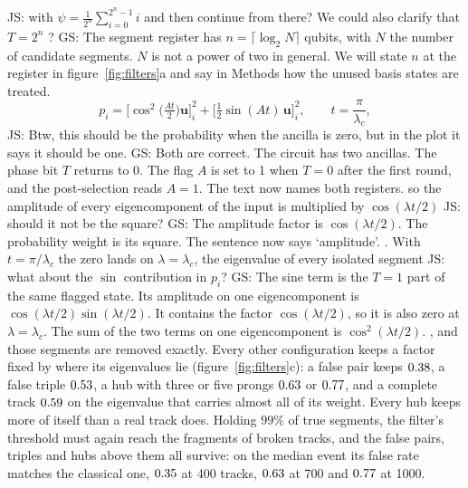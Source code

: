 \documentclass[11pt,a4paper]{article}
\newcommand{\js}[1]{{\color{blue} JS: #1 }}
\newcommand{\gs}[1]{{\color{orange!85!black} GS: #1 }}
\begin{document}
\js{with $\psi = \frac 1 {2^n} \sum_{i=0}^{2^n-1} i$ and then continue from there? We could also clarify that $T = 2^n$ ?} \gs{The segment register has $n=\lceil\log_2 N\rceil$ qubits, with $N$ the number of candidate segments. $N$ is not a power of two in general. We will state $n$ at the register in figure~\ref{fig:filters}a and say in Methods how the unused basis states are treated.}
\begin{equation}
p_i=\Big[\cos^{2}\!\big(\tfrac{At}{2}\big)\mathbf{u}\Big]_i^{2}+\Big[\tfrac12\sin(At)\,\mathbf{u}\Big]_i^{2},\qquad t=\frac{\pi}{\lambda_c},
\end{equation}
\js{Btw, this should be the probability when the ancilla is zero, but in the plot it says it should be one.} \gs{Both are correct. The circuit has two ancillas. The phase bit $T$ returns to 0. The flag $A$ is set to 1 when $T=0$ after the first round, and the post-selection reads $A=1$. The text now names both registers.}
so the amplitude of every eigencomponent of the input is multiplied by $\cos(\lambda t/2)$ \js{should it not be the square?} \gs{The amplitude factor is $\cos(\lambda t/2)$. The probability weight is its square. The sentence now says `amplitude'.}. With $t=\pi/\lambda_c$ the
zero lands on $\lambda=\lambda_c$, the eigenvalue of every isolated segment \js{what about the $\sin$ contribution in $p_i$?} \gs{The sine term is the $T=1$ part of the same flagged state. Its amplitude on one eigencomponent is $\cos(\lambda t/2)\sin(\lambda t/2)$. It contains the factor $\cos(\lambda t/2)$, so it is also zero at $\lambda=\lambda_c$. The sum of the two terms on one eigencomponent is $\cos^2(\lambda t/2)$.}, and those segments are removed
exactly. Every other configuration keeps a factor fixed by where its eigenvalues lie
(figure~\ref{fig:filters}c): a false pair keeps $0.38$, a false triple $0.53$, a
hub with three or five prongs $0.63$ or $0.77$, and a complete track
$0.59$ on the eigenvalue that carries almost all of its weight. Every hub keeps more of
itself than a real track does. Holding $99\%$ of true segments, the filter's threshold must again reach the fragments of
broken tracks, and the false pairs, triples and hubs above them all survive: on the median event its
false rate matches the classical one, $0.35$ at 400 tracks,
$0.63$ at 700 and $0.77$ at 1000.
\end{document}
